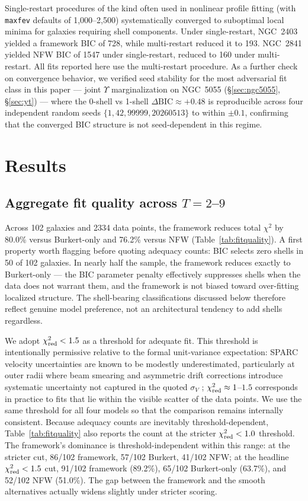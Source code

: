 \documentclass[linenumbers]{aastex701}
\newcommand{\Yt}{\Upsilon}
\newcommand{\chired}{\chi^2_{\rm red}}
\begin{document}
Single-restart procedures of the kind often used in nonlinear profile fitting (with \texttt{maxfev} defaults of 1{,}000--2{,}500) systematically converged to suboptimal local minima for galaxies requiring shell components. Under single-restart, NGC~2403 yielded a framework BIC of 728, while multi-restart reduced it to 193. NGC~2841 yielded NFW BIC of 1547 under single-restart, reduced to 160 under multi-restart. All fits reported here use the multi-restart procedure. As a further check on convergence behavior, we verified seed stability for the most adversarial fit class in this paper --- joint $\Yt$ marginalization on NGC~5055 (\S\ref{sec:ngc5055}, \S\ref{sec:yt}) --- where the 0-shell vs 1-shell $\Delta\mathrm{BIC} \approx +0.48$ is reproducible across four independent random seeds $\{1, 42, 99999, 20260513\}$ to within $\pm 0.1$, confirming that the converged BIC structure is not seed-dependent in this regime.


\section{Results}\label{sec:results}

\subsection{Aggregate fit quality across $T=2$--$9$}\label{sec:aggregate}

Across 102 galaxies and 2334 data points, the framework reduces total $\chi^2$ by 80.0\% versus Burkert-only and 76.2\% versus NFW (Table~\ref{tab:fitquality}). A first property worth flagging before quoting adequacy counts: BIC selects zero shells in 50 of 102 galaxies. In nearly half the sample, the framework reduces exactly to Burkert-only --- the BIC parameter penalty effectively suppresses shells when the data does not warrant them, and the framework is not biased toward over-fitting localized structure. The shell-bearing classifications discussed below therefore reflect genuine model preference, not an architectural tendency to add shells regardless.

We adopt $\chired < 1.5$ as a threshold for adequate fit. This threshold is intentionally permissive relative to the formal unit-variance expectation: SPARC velocity uncertainties are known to be modestly underestimated, particularly at outer radii where beam smearing and asymmetric drift corrections introduce systematic uncertainty not captured in the quoted $\sigma_V$ \citep[][\S3.2]{Lelli2016}; $\chired \approx 1$--$1.5$ corresponds in practice to fits that lie within the visible scatter of the data points. We use the same threshold for all four models so that the comparison remains internally consistent. Because adequacy counts are inevitably threshold-dependent, Table~\ref{tab:fitquality} also reports the count at the stricter $\chired < 1.0$ threshold. The framework's dominance is threshold-independent within this range: at the stricter cut, 86/102 framework, 57/102 Burkert, 41/102 NFW; at the headline $\chired < 1.5$ cut, 91/102 framework (89.2\%), 65/102 Burkert-only (63.7\%), and 52/102 NFW (51.0\%). The gap between the framework and the smooth alternatives actually widens slightly under stricter scoring.
\end{document}

